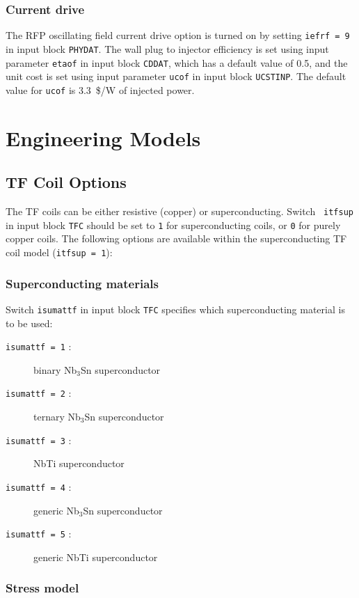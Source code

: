 \documentclass[11pt,a4paper]{report}
\begin{document}
\subsubsection{Current drive}
\label{sec:rfpcd}
The RFP oscillating field current drive option is turned on by setting
\texttt{iefrf = 9} in input block \texttt{PHYDAT}. The wall plug to injector
efficiency is set using input parameter \texttt{etaof} in input block
\texttt{CDDAT}, which has a default value of 0.5, and the unit cost is set
using input parameter \texttt{ucof} in input block \texttt{UCSTINP}. The
default value for \texttt{ucof} is 3.3~\$/W of injected power.

\section{Engineering Models}

\subsection{TF Coil Options}

The TF coils can be either resistive (copper) or superconducting. Switch {\tt
itfsup} in input block {\tt TFC} should be set to {\tt 1} for superconducting
coils, or {\tt 0} for purely copper coils. The following options are available
within the superconducting TF coil model ({\tt itfsup = 1}):

\subsubsection{Superconducting materials}

Switch {\tt isumattf} in input block {\tt TFC} specifies which superconducting
material is to be used:
\begin{description}
\item [{\tt isumattf = 1} :] binary Nb$_3$Sn superconductor
\item [{\tt isumattf = 2} :] ternary Nb$_3$Sn superconductor
\item [{\tt isumattf = 3} :] NbTi superconductor
\item [{\tt isumattf = 4} :] generic Nb$_3$Sn superconductor
\item [{\tt isumattf = 5} :] generic NbTi superconductor
\end{description}

\subsubsection{Stress model}
\end{document}
